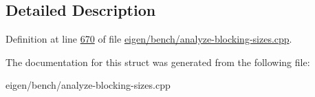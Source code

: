 \subsection{Detailed Description}


Definition at line \hyperlink{eigen_2bench_2analyze-blocking-sizes_8cpp_source_l00670}{670} of file \hyperlink{eigen_2bench_2analyze-blocking-sizes_8cpp_source}{eigen/bench/analyze-\/blocking-\/sizes.\+cpp}.



The documentation for this struct was generated from the following file\+:\begin{DoxyCompactItemize}
\item 
eigen/bench/analyze-\/blocking-\/sizes.\+cpp\end{DoxyCompactItemize}
